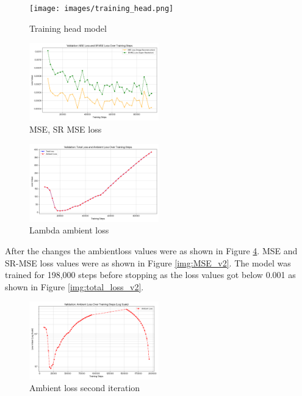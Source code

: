 \documentclass[12pt]{article}
\begin{document}
\begin{figure}[h!]
    \centering
    \texttt{[image: images/training\_head.png]}
    \caption{Training head model}
    \label{img:training_head}
\end{figure}

\begin{figure}[h!]
    \centering
    \includegraphics[width=0.5\textwidth]{images/mse_sr_mse_loss.png}
    \caption{MSE, SR MSE loss}
    \label{img:mse_sr_mse_loss}
\end{figure}

\begin{figure}[h!]
    \centering
    \includegraphics[width=0.5\textwidth]{images/lambda_ambient_loss.png}
    \caption{Lambda ambient loss}
    \label{img:lambda_ambient_loss}
\end{figure}

After the changes the ambientloss values were as shown in Figure \ref{img:ambient_loss_v2}. MSE and SR-MSE loss values were as shown in Figure \ref{img:MSE_v2}. The model was trained for 198,000 steps before stopping as the loss values got below 0.001 as shown in Figure \ref{img:total_loss_v2}.

\begin{figure}[h!]
    \centering
    \includegraphics[width=0.5\textwidth]{images/ambient_loss_v2.png}
    \caption{Ambient loss second iteration}
    \label{img:ambient_loss_v2}
\end{figure}
\end{document}
